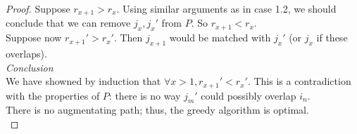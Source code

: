\documentclass[12pt]{article}
\begin{document}
\begin{proof}
    Suppose $r_{x+1} > r_x$. Using similar arguments as in case 1.2, we should conclude that we can remove $j_x, j_x'$ from $P$. So $r_{x+1} < r_x$. \\
    Suppose now $r_{x+1}' > r_x'$. Then $j_{x+1}$ would be matched with $j_x'$ (or $j_x$ if these overlaps).\\

    \textit{Conclusion} \\
    We have showned by induction that $\forall x>1, r_{x+1}' < r_x'$. This is a contradiction with the properties of $P$: there is no way $j_m'$ could possibly overlap $i_n$. \\
    There is no augmentating path; thus, the greedy algorithm is optimal. \\

    
\end{proof}
\end{document}
